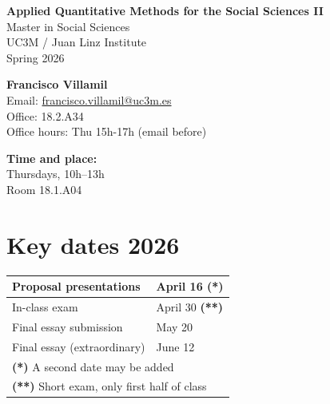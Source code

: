 \documentclass[12pt, a4paper]{article}
\begin{document}
\begin{center}
{\Large\bf Applied Quantitative Methods for the Social Sciences II}\\\vspace{10pt}
Master in Social Sciences\\UC3M / Juan Linz Institute\\
\vspace{10pt}
{\large Spring 2026}\\
\end{center}

\vspace{15pt}

\begin{minipage}{0.6\textwidth}
\textbf{Francisco Villamil}\\
Email: \href{francisco.villamil@uc3m.es}{francisco.villamil@uc3m.es}\\
Office: 18.2.A34\\
Office hours: Thu 15h-17h (email before)
\end{minipage}\hfill
\begin{minipage}{0.39\textwidth}
\centering
\textbf{Time and place:}\\
Thursdays, 10h--13h\\Room 18.1.A04
\end{minipage}

\section*{Key dates 2026}

\begin{center}
\begin{tabular}{|l|l|}
\hline
Proposal presentations      & April 16 \textbf{(*)} \\
\hline
In-class exam               & April 30 \textbf{(**)} \\
\hline
Final essay submission      & May 20 \\
Final essay (extraordinary) & June 12 \\
\hline
\multicolumn{2}{l}{\footnotesize \textbf{(*)} A second date may be added}\\
\multicolumn{2}{l}{\footnotesize \textbf{(**)} Short exam, only first half of class}

\end{tabular}
\end{center}
\end{document}
